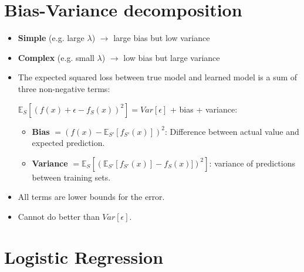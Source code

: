 \section{Bias-Variance decomposition}
\begin{itemize}
	\item {\bf Simple} (e.g. large  $\lambda$) $\rightarrow$ large bias but low variance
	\item {\bf Complex} (e.g. small  $\lambda$) $\rightarrow$ low bias but large variance
	\item The expected squared loss between true model and learned model is a sum of three non-negative terms:

	 	$\mathbb{E}_S[(f(x) + \epsilon - f_{S}(x))^2] = Var[\epsilon]$ + bias + variance:
	\begin{itemize}
	 	\item \textbf{Bias} $= (f(x) - \mathbb{E}_{S'}[f_{S'}(x)])^2$: Difference between actual value and expected prediction.
	 	\item \textbf{Variance} $= \mathbb{E}_S[(\mathbb{E}_{S'}[f_{S'}(x)] - f_S(x)])^2]$: variance of predictions between training sets.
	\end{itemize}
	
	\item All terms are lower bounds for the error.
	\item Cannot do better than $Var[\epsilon]$.
	
\end{itemize}

\section{Logistic Regression}

